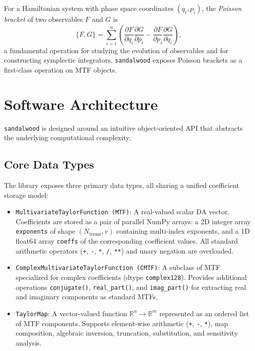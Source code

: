 \documentclass[aps,prb,reprint,superscriptaddress,nofootinbib]{revtex4-2}
\begin{document}
For a Hamiltonian system with phase space coordinates $(q_i, p_i)$, the \emph{Poisson bracket} of two observables $F$ and $G$ is
\begin{equation}
    \{F, G\} = \sum_{i=1}^{n} \left(\frac{\partial F}{\partial q_i}\frac{\partial G}{\partial p_i} - \frac{\partial F}{\partial p_i}\frac{\partial G}{\partial q_i}\right),
\end{equation}
a fundamental operation for studying the evolution of observables and for constructing symplectic integrators. \texttt{sandalwood} exposes Poisson brackets as a first-class operation on MTF objects.

\section{Software Architecture}
\label{sec:architecture}

\texttt{sandalwood} is designed around an intuitive object-oriented API that abstracts the underlying computational complexity.

\subsection{Core Data Types}

The library exposes three primary data types, all sharing a unified coefficient storage model:
\begin{itemize}
    \item \texttt{MultivariateTaylorFunction (MTF)}: A real-valued scalar DA vector. Coefficients are stored as a pair of parallel NumPy arrays: a 2D integer array \texttt{exponents} of shape $(N_{\text{terms}},v)$ containing multi-index exponents, and a 1D float64 array \texttt{coeffs} of the corresponding coefficient values. All standard arithmetic operators (\texttt{+}, \texttt{-}, \texttt{*}, \texttt{/}, \texttt{**}) and unary negation are overloaded.

    \item \texttt{ComplexMultivariateTaylorFunction (CMTF)}: A subclass of MTF specialized for complex coefficients (dtype \texttt{complex128}). Provides additional operations \texttt{conjugate()}, \texttt{real\_part()}, and \texttt{imag\_part()} for extracting real and imaginary components as standard MTFs.

    \item \texttt{TaylorMap}: A vector-valued function $\mathbb{R}^n \to \mathbb{R}^m$ represented as an ordered list of MTF components. Supports element-wise arithmetic (\texttt{+}, \texttt{-}, \texttt{*}), map composition, algebraic inversion, truncation, substitution, and sensitivity analysis.
\end{itemize}
\end{document}
